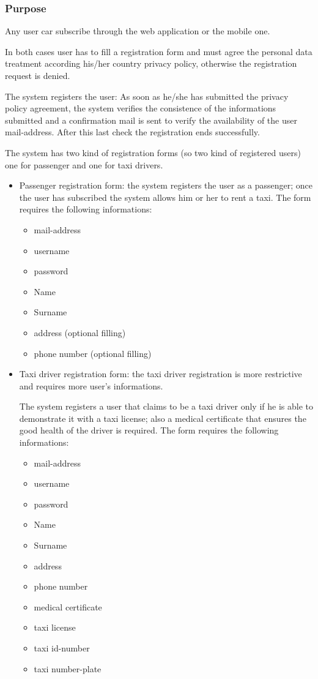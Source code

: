 \label{user-registration}
\subsubsection{Purpose}
Any user car subscribe through the web application or the mobile one. 

In both cases user has to fill a registration form and must agree the personal data treatment according his/her country privacy policy, otherwise the registration request is denied.

The system registers the user: 
As soon as he/she has submitted the privacy policy agreement, the system verifies the consistence of the informations submitted and a confirmation mail is sent to verify the availability of the user mail-address. 
After this last check the registration ends successfully.

The system has two kind of registration forms (so two kind of registered users) one for passenger and one for taxi drivers.

\begin{itemize}
\item Passenger registration form: the system registers the user as a passenger; once the user has subscribed the system allows him or her to rent a taxi. 
The form requires the following informations:
\begin{itemize}
\item mail-address
\item username 
\item password
\item Name
\item Surname
\item address (optional filling)
\item phone number (optional filling)
\end{itemize}



\item Taxi driver registration form: the taxi driver registration is more restrictive and requires more user's informations.

The system registers a user that claims to be a taxi driver only if he is able to demonstrate it with a taxi license; also a medical certificate that ensures the good health of the driver is required.
The form requires the following informations:
\begin{itemize}
\item mail-address
\item username 
\item password
\item Name
\item Surname
\item address 
\item phone number
\item medical certificate
\item taxi license
\item taxi id-number
\item taxi number-plate
\end{itemize}
\end{itemize}



